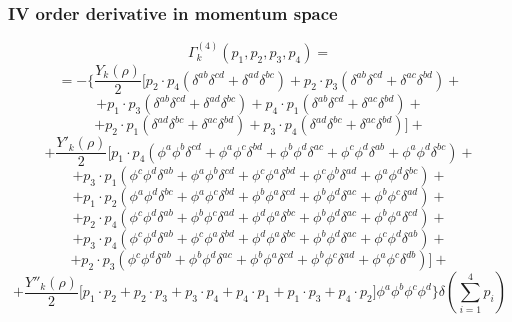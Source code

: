 \subsubsection{IV order derivative in momentum space}
\begin{equation}\label{Y4}
 \Gamma^{(4)}_k (p_1, p_2, p_3, p_4) = 
\end{equation}
$$= -\Big\{\frac{Y_k(\rho)}{2}\Big[p_2\cdot p_4 (\delta^{ab}\delta^{cd}+\delta^{ad}\delta^{bc}) + p_2\cdot p_3(\delta^{ab}\delta^{cd}+ \delta^{ac}\delta^{bd}) +$$
$$+p_1\cdot p_3(\delta^{ab}\delta^{cd}+ \delta^{ad}\delta^{bc}) + p_4\cdot p_1(\delta^{ab}\delta^{cd} + \delta^{ac}\delta^{bd}) +$$
$$+p_2\cdot p_1(\delta^{ad}\delta^{bc} + \delta^{ac}\delta^{bd}) + p_3\cdot p_4(\delta^{ad}\delta^{bc} + \delta^{ac}\delta^{bd})\Big]+$$
$$+ \frac{Y'_k(\rho)}{2}\Big[p_1 \cdot p_4 (\phi^a\phi^b\delta^{cd} + \phi^a\phi^c\delta^{bd} + \phi^b\phi^d\delta^{ac} + \phi^c\phi^d\delta^{ab} + \phi^a\phi^d\delta^{bc}) + $$
$$+ p_3 \cdot p_1 (\phi^c\phi^d\delta^{ab} + \phi^a\phi^b\delta^{cd} + \phi^c\phi^a\delta^{bd} + \phi^c\phi^b\delta^{ad} + \phi^a\phi^d\delta^{bc}) + $$
$$+ p_1 \cdot p_2 (\phi^a\phi^d\delta^{bc} + \phi^a\phi^c\delta^{bd} + \phi^b\phi^a\delta^{cd} + \phi^b\phi^d\delta^{ac} + \phi^b\phi^c\delta^{ad}) + $$
$$+ p_2 \cdot p_4 (\phi^c\phi^d\delta^{ab} + \phi^b\phi^c\delta^{ad} +  \phi^d\phi^a\delta^{bc} + \phi^b\phi^d\delta^{ac} +\phi^b\phi^a\delta^{cd}) + $$
$$+ p_3 \cdot p_4 (\phi^c\phi^d\delta^{ab} + \phi^c\phi^a\delta^{bd} + \phi^d\phi^a\delta^{bc} + \phi^b\phi^d\delta^{ac} + \phi^c\phi^d\delta^{ab}) + $$
$$+ p_2 \cdot p_3 (\phi^c\phi^d\delta^{ab} + \phi^b\phi^d\delta^{ac} + \phi^b\phi^a\delta^{cd} + \phi^b\phi^c\delta^{ad} + \phi^a\phi^c\delta^{db})\Big]+$$
$$+ \frac{Y''_k(\rho)}{2}\Big[p_1\cdot p_2 + p_2\cdot p_3 + p_3\cdot p_4 + p_4\cdot p_1 + p_1\cdot p_3 + p_4\cdot p_2 \Big]\phi^a\phi^b\phi^c\phi^d\Bigg\} \delta\left(\sum_{i=1}^4 p_i\right)$$
